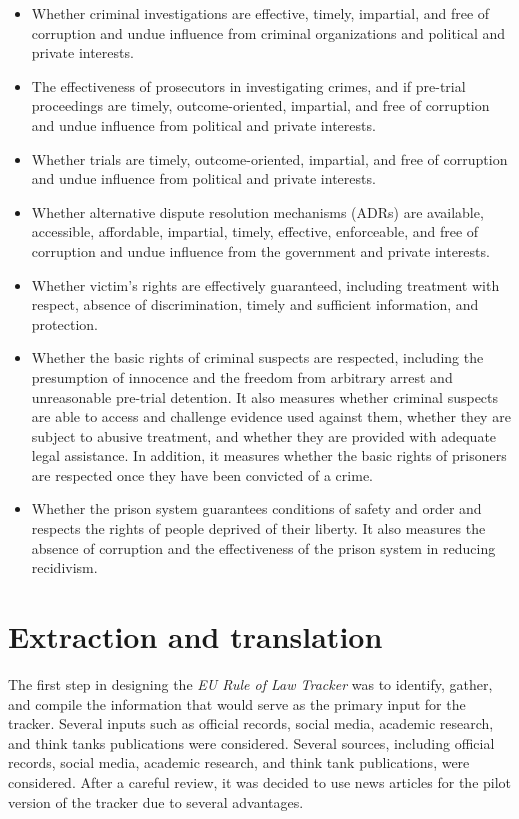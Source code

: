 \documentclass[
]{agujournal2019}
\providecommand{\tightlist}{%
  \setlength{\itemsep}{0pt}\setlength{\parskip}{0pt}}\usepackage{longtable,booktabs,array}
\begin{document}
\begin{itemize}
\tightlist
\item
  Whether criminal investigations are effective, timely, impartial, and
  free of corruption and undue influence from criminal organizations and
  political and private interests.
\item
  The effectiveness of prosecutors in investigating crimes, and if
  pre-trial proceedings are timely, outcome-oriented, impartial, and
  free of corruption and undue influence from political and private
  interests.
\item
  Whether trials are timely, outcome-oriented, impartial, and free of
  corruption and undue influence from political and private interests.
\item
  Whether alternative dispute resolution mechanisms (ADRs) are
  available, accessible, affordable, impartial, timely, effective,
  enforceable, and free of corruption and undue influence from the
  government and private interests.
\item
  Whether victim's rights are effectively guaranteed, including
  treatment with respect, absence of discrimination, timely and
  sufficient information, and protection.
\item
  Whether the basic rights of criminal suspects are respected, including
  the presumption of innocence and the freedom from arbitrary arrest and
  unreasonable pre-trial detention. It also measures whether criminal
  suspects are able to access and challenge evidence used against them,
  whether they are subject to abusive treatment, and whether they are
  provided with adequate legal assistance. In addition, it measures
  whether the basic rights of prisoners are respected once they have
  been convicted of a crime.
\item
  Whether the prison system guarantees conditions of safety and order
  and respects the rights of people deprived of their liberty. It also
  measures the absence of corruption and the effectiveness of the prison
  system in reducing recidivism.
\end{itemize}

\section{Extraction and translation}\label{extraction-and-translation}

The first step in designing the \emph{EU Rule of Law Tracker} was to
identify, gather, and compile the information that would serve as the
primary input for the tracker. Several inputs such as official records,
social media, academic research, and think tanks publications were
considered. Several sources, including official records, social media,
academic research, and think tank publications, were considered. After a
careful review, it was decided to use news articles for the pilot
version of the tracker due to several advantages.
\end{document}
